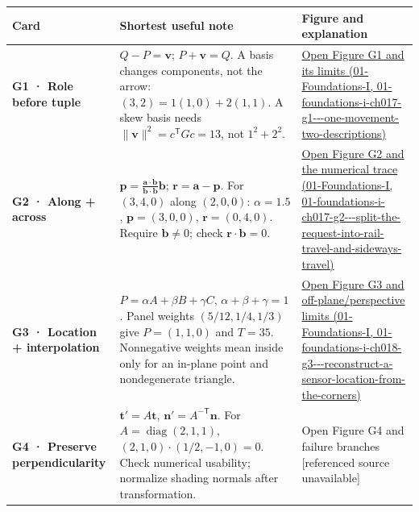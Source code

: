 {\def\LTcaptype{none} %
\begin{longtable}[]{@{}
  >{\raggedright\arraybackslash}p{}
  >{\raggedright\arraybackslash}p{}
  >{\raggedright\arraybackslash}p{}@{}}
\toprule\noalign{}
\begin{minipage}[b]{\linewidth}\raggedright
Card
\end{minipage} & \begin{minipage}[b]{\linewidth}\raggedright
Shortest useful note
\end{minipage} & \begin{minipage}[b]{\linewidth}\raggedright
Figure and explanation
\end{minipage} \\
\midrule\noalign{}
\endhead
\bottomrule\noalign{}
\endlastfoot
\textbf{G1 · Role before tuple} & \(Q-P=\mathbf v\); \(P+\mathbf v=Q\). A basis changes components, not the arrow: \((3,2)=1(1,0)+2(1,1)\). A skew basis needs \(\|\mathbf v\|^2=c^\mathsf TGc=13\), not \(1^2+2^2\). & \href{../01-Foundations-I/main.pdf\#nameddest=01-foundations-i-ch017-g1---one-movement-two-descriptions}{Open Figure G1 and its limits (01-Foundations-I, 01-foundations-i-ch017-g1-\/-\/-one-movement-two-descriptions)} \\
\textbf{G2 · Along + across} & \(\mathbf p=\frac{\mathbf a\cdot\mathbf b}{\mathbf b\cdot\mathbf b}\mathbf b\); \(\mathbf r=\mathbf a-\mathbf p\). For \((3,4,0)\) along \((2,0,0)\): \(\alpha=1.5\), \(\mathbf p=(3,0,0)\), \(\mathbf r=(0,4,0)\). Require \(\mathbf b\ne0\); check \(\mathbf r\cdot\mathbf b=0\). & \href{../01-Foundations-I/main.pdf\#nameddest=01-foundations-i-ch017-g2---split-the-request-into-rail-travel-and-sideways-travel}{Open Figure G2 and the numerical trace (01-Foundations-I, 01-foundations-i-ch017-g2-\/-\/-split-the-request-into-rail-travel-and-sideways-travel)} \\
\textbf{G3 · Location + interpolation} & \(P=\alpha A+\beta B+\gamma C\), \(\alpha+\beta+\gamma=1\). Panel weights \((5/12,1/4,1/3)\) give \(P=(1,1,0)\) and \(T=35\). Nonnegative weights mean inside only for an in-plane point and nondegenerate triangle. & \href{../01-Foundations-I/main.pdf\#nameddest=01-foundations-i-ch018-g3---reconstruct-a-sensor-location-from-the-corners}{Open Figure G3 and off-plane/perspective limits (01-Foundations-I, 01-foundations-i-ch018-g3-\/-\/-reconstruct-a-sensor-location-from-the-corners)} \\
\textbf{G4 · Preserve perpendicularity} & \(\mathbf t'=A\mathbf t\), \(\mathbf n'=A^{-\mathsf T}\mathbf n\). For \(A=\operatorname{diag}(2,1,1)\), \((2,1,0)\cdot(1/2,-1,0)=0\). Check numerical usability; normalize shading normals after transformation. & {Open Figure G4 and failure branches {[}referenced source unavailable{]}} \\
\end{longtable}
}

